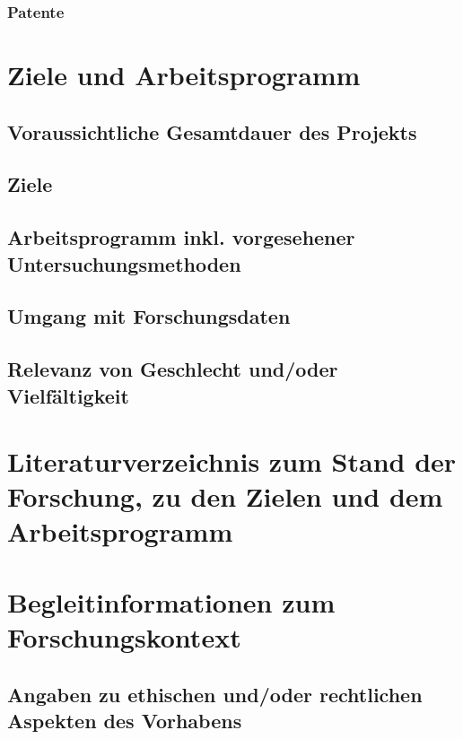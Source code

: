 \documentclass[de]{dfg-proposal}
\begin{document}
            \subsubsection{Patente}


    \section{Ziele und Arbeitsprogramm}\label{sec:ziele-und-arbeitsprogramm}

        \subsection{Voraussichtliche Gesamtdauer des Projekts}

        \subsection{Ziele}

        \subsection{Arbeitsprogramm inkl. vorgesehener Untersuchungsmethoden}

        \subsection{Umgang mit Forschungsdaten}

        \subsection{Relevanz von Geschlecht und/oder Vielfältigkeit}


    \section{Literaturverzeichnis zum Stand der Forschung, zu den Zielen und dem Arbeitsprogramm}\label{sec:literaturverzeichnis}

        \printbibliography

        \partbreak


    \section{Begleitinformationen zum Forschungskontext}\label{sec:begleitinformationen-zum-forschungskontext}

        \subsection{Angaben zu ethischen und/oder rechtlichen Aspekten des Vorhabens}
\end{document}
